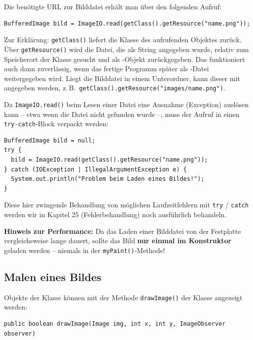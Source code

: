 Die benötigte URL zur Bilddatei erhält man über den folgenden Aufruf:

\begin{lstlisting}
BufferedImage bild = ImageIO.read(getClass().getResource("name.png"));
\end{lstlisting}

Zur Erklärung: \lstinline|getClass()| liefert die Klasse des aufrufenden
Objektes zurück. Über \lstinline|getResource()| wird die Datei, die als String
angegeben wurde, relativ zum Speicherort der Klasse gesucht und als
-Objekt zurückgegeben. Das funktioniert auch dann zuverlässig,
wenn das fertige Programm später als -Datei weitergegeben wird.
Liegt die Bilddatei in einem Unterordner, kann dieser mit angegeben werden,
z.\,B.\ \lstinline|getClass().getResource("images/name.png")|.

Da \lstinline|ImageIO.read()| beim Lesen einer Datei eine Ausnahme (Exception)
auslösen kann -- etwa wenn die Datei nicht gefunden wurde --, muss der Aufruf in
einen \lstinline|try-catch|-Block verpackt werden:

\begin{lstlisting}
BufferedImage bild = null;
try {
  bild = ImageIO.read(getClass().getResource("name.png"));
} catch (IOException | IllegalArgumentException e) {
  System.out.println("Problem beim Laden eines Bildes!");
}
\end{lstlisting}

Diese hier zwingende Behandlung von möglichen Laufzeitfehlern mit \lstinline|try| 
/ \lstinline|catch| werden wir in Kapitel 25 (Fehlerbehandlung) noch ausführlich 
behandeln.

\noindent \textbf{Hinweis zur Performance:} Da das Laden einer Bilddatei von
der Festplatte vergleichsweise lange dauert, sollte das Bild \textbf{nur einmal
im Konstruktor} geladen werden -- niemals in der \lstinline|myPaint()|-Methode!


\subsection{Malen eines Bildes}

Objekte der Klasse  können mit der Methode
\lstinline|drawImage()| der Klasse  angezeigt werden:

\begin{lstlisting}
public boolean drawImage(Image img, int x, int y, ImageObserver observer)
\end{lstlisting}

